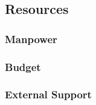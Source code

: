 \subsection{Resources}

\subsubsection{Manpower}

\subsubsection{Budget}
\label{sec:3.2.2}



\subsubsection{External Support}

